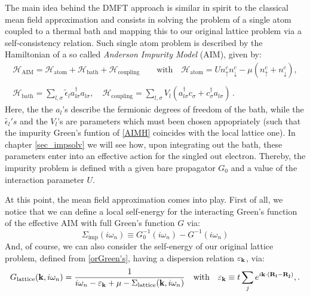 The main idea behind the DMFT approach is similar in spirit to the classical mean field approximation and consists in solving the problem of a single atom coupled to a thermal bath and mapping this to our original lattice problem via a self-consistency relation.
Such single atom problem is described by the Hamiltonian of a so called \emph{Anderson Impurity Model} (AIM), given by:
%
\begin{equation}\label{AIMH}
\begin{array}{c}
\mathcal{H}_{\text{AIM}} = \mathcal{H}_{\text{atom}} + \mathcal{H}_{\text{bath}} + \mathcal{H}_{\text{coupling}}
\quad \quad
\text{with}
\quad
\mathcal{H}_{\text{atom}} = Un_\uparrow^cn_\downarrow^c - \mu (n_\uparrow^c+n_\downarrow^c),
\\ 
\\ 
\mathcal{H}_{\text{bath}} = \sum_{l,\sigma}\tilde{\epsilon}_la_{l\sigma}^\dagger a_{l\sigma},
\quad
\mathcal{H}_{\text{coupling}} = \sum_{l,\sigma}V_l(a_{l\sigma}^\dagger c_{\sigma} + c_{\sigma}^\dagger a_{l\sigma})
\, .
\end{array}
\end{equation}
%
Here, the the $a_l$'s describe the fermionic degrees of freedom of the bath, while the $\tilde{\epsilon_l}'s$ and the $V_l$'s are parameters which must been chosen appopriately (such that the impurity Green's funtion of \eqref{AIMH} coincides with the local lattice one). In chapter \ref{sec_impsolv} we will see how, upon integrating out the bath, these parameters enter into an effective action for the singled out electron. Thereby, the impurity problem is defined with a given bare propagator $G_0$ and a value of the interaction parameter $U$.

At this point, the mean field approximation comes into play. First of all, we notice that we can define a local self-energy for the interacting Green's function of the effective AIM with full Green's function $G$ via:
%
\begin{equation}\label{s_imp}
\Sigma_{\text{imp}}(i\omega_n) \equiv G_0^{-1}(i\omega_n) - G^{-1}(i\omega_n)
\end{equation}
%
And, of course, we can also consider the self-energy of our original lattice problem, defined from \eqref{orGreen's}, having a dispersion relation $\varepsilon_{\bold{k}}$, via:
%
\begin{equation} \label{not_summed_over}
G_{\text{lattice}}(\bold{k},i\omega_n) = \frac{1}{i\omega_n - \varepsilon_{\bold{k}} + \mu -\Sigma_{\text{lattice}}(\bold{k},i\omega_n)}
\quad \text{with}
\quad
\varepsilon_\bold{k} \equiv t \sum_j e^{i\bold{k} \cdot ( \bold{R_i} - \bold{R_j} )}
, .
\end{equation}


